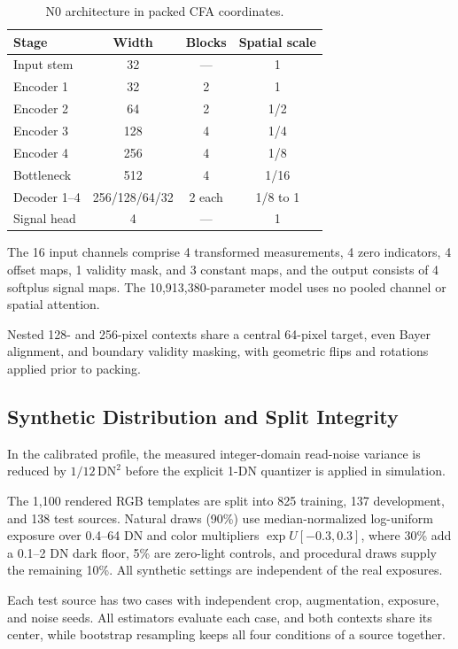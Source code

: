 \documentclass[10pt,twocolumn,journal]{IEEEtran}
\begin{document}
\begin{table}[t]
\centering
\caption{N0 architecture in packed CFA coordinates.}
\label{tab:architecture}
\footnotesize
\setlength{\tabcolsep}{3pt}
\begin{tabular}{@{}lccc@{}}
\toprule
Stage & Width & Blocks & Spatial scale\\
\midrule
Input stem & 32 & --- & 1\\
Encoder 1 & 32 & 2 & 1\\
Encoder 2 & 64 & 2 & 1/2\\
Encoder 3 & 128 & 4 & 1/4\\
Encoder 4 & 256 & 4 & 1/8\\
Bottleneck & 512 & 4 & 1/16\\
Decoder 1--4 & 256/128/64/32 & 2 each & 1/8 to 1\\
Signal head & 4 & --- & 1\\
\bottomrule
\end{tabular}

\vspace{3pt}
\footnotesize The 16 input channels comprise 4 transformed measurements, 4 zero indicators, 4 offset maps, 1 validity mask, and 3 constant maps, and the output consists of 4 softplus signal maps. The 10,913,380-parameter model uses no pooled channel or spatial attention.
\end{table}

Nested 128- and 256-pixel contexts share a central 64-pixel target, even Bayer alignment, and boundary validity masking, with geometric flips and rotations applied prior to packing.

\subsection{Synthetic Distribution and Split Integrity}
In the calibrated profile, the measured integer-domain read-noise variance is reduced by $1/12\,\mathrm{DN}^2$ before the explicit 1-DN quantizer is applied in simulation.

The 1,100 rendered RGB templates are split into 825 training, 137 development, and 138 test sources. Natural draws (90\%) use median-normalized log-uniform exposure over 0.4--64 DN and color multipliers $\exp U[-0.3,0.3]$, where 30\% add a 0.1--2 DN dark floor, 5\% are zero-light controls, and procedural draws supply the remaining 10\%. All synthetic settings are independent of the real exposures.

Each test source has two cases with independent crop, augmentation, exposure, and noise seeds. All estimators evaluate each case, and both contexts share its center, while bootstrap resampling keeps all four conditions of a source together.
\end{document}
